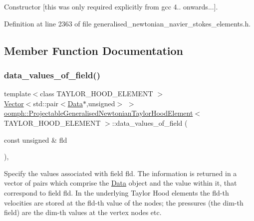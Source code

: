Constructor \mbox{[}this was only required explicitly from gcc 4.. onwards...\mbox{]}. 



Definition at line 2363 of file generalised\+\_\+newtonian\+\_\+navier\+\_\+stokes\+\_\+elements.\+h.



\subsection{Member Function Documentation}
\mbox{\label{classoomph_1_1ProjectableGeneralisedNewtonianTaylorHoodElement_a1734ba15f3c3062571a83c3e23933e6a}} 
\subsubsection{\texorpdfstring{data\+\_\+values\+\_\+of\+\_\+field()}{data\_values\_of\_field()}}
{\footnotesize\ttfamily template$<$class T\+A\+Y\+L\+O\+R\+\_\+\+H\+O\+O\+D\+\_\+\+E\+L\+E\+M\+E\+NT $>$ \\
\hyperlink{classoomph_1_1Vector}{Vector}$<$std\+::pair$<$\hyperlink{classoomph_1_1Data}{Data}$\ast$,unsigned$>$ $>$ \hyperlink{classoomph_1_1ProjectableGeneralisedNewtonianTaylorHoodElement}{oomph\+::\+Projectable\+Generalised\+Newtonian\+Taylor\+Hood\+Element}$<$ T\+A\+Y\+L\+O\+R\+\_\+\+H\+O\+O\+D\+\_\+\+E\+L\+E\+M\+E\+NT $>$\+::data\+\_\+values\+\_\+of\+\_\+field (\begin{DoxyParamCaption}\item[{const unsigned \&}]{fld }\end{DoxyParamCaption})\hspace{0.3cm}{\ttfamily [inline]}, {\ttfamily [virtual]}}



Specify the values associated with field fld. The information is returned in a vector of pairs which comprise the \hyperlink{classoomph_1_1Data}{Data} object and the value within it, that correspond to field fld. In the underlying Taylor Hood elements the fld-\/th velocities are stored at the fld-\/th value of the nodes; the pressures (the dim-\/th field) are the dim-\/th values at the vertex nodes etc. 




